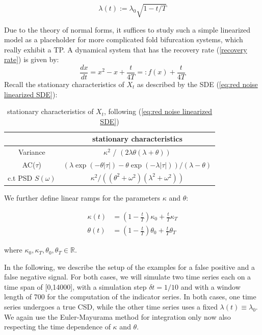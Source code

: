 \documentclass[%
thesis=student,%
coverpage=false,%
titlepage=false,%
headmarks=true, %
english,%
font=libertine, %
math=newpxtx, %
BCOR=5mm,%
coverBCOR=11mm%
]{tumbook}
\begin{document}
\begin{equation}
    \lambda(t) := \lambda_{0}\sqrt{1-t/T}
    \label{recovery rate}
\end{equation}
    
Due to the theory of normal forms, it suffices to study such a simple linearized model as a placeholder for more complicated fold bifurcation systems, which really exhibit a TP. A dynamical system that has the recovery rate (\ref{recovery rate}) is given by:
\[
\frac{dx}{dt} = x^2 - x + \frac{t}{4T} =: f(x) + \frac{t}{4T}
\]
Recall the stationary characteristics of $X_{t}$ as described by the SDE (\ref{eq:red noise linearized SDE}): 

\begin{table}[h!]
\centering
\begin{tabular}{|c|c|}
\hline
& stationary characteristics\\
\hline
Variance & $\kappa^2$ / $(2\lambda\theta(\lambda + \theta))$\\
AC($\tau$) & $(\lambda\exp(-\theta\lvert\tau\rvert)-\theta\exp(-\lambda\lvert\tau\rvert))/(\lambda - \theta)$\\
c.t PSD $S(\omega)$ & $\kappa^2/((\theta^2 + \omega^2)(\lambda^2 + \omega^2))$\\
\hline
\end{tabular}
\caption{stationary characteristics of $X_{t}$, following (\ref{eq:red noise linearized SDE})}
\label{tab:simple_table}
\end{table}

We further define linear ramps for the parameters $\kappa$ and $\theta$:

\begin{subequations}
    \begin{align*}
        \kappa(t) &= (1-\frac{t}{T})\kappa_{0} + \frac{t}{T}\kappa_{T} \\
        \theta(t) &= (1-\frac{t}{T})\theta_{0} + \frac{t}{T}\theta_{T}
    \end{align*}
\end{subequations}

where $\kappa_{0},\kappa_{T},\theta_{0},\theta_{T} \in \mathbb{R}$. 

In the following, we describe the setup of the examples for a false positive and a false negative signal. For both cases, we will simulate two time series each on a time span of [0,14000], with a simulation step $\delta t = 1/10$ and with a window length of 700 for the computation of the indicator series. In both cases, one time series undergoes a true CSD, while the other time series uses a fixed $\lambda(t) \equiv \lambda_{0}$. We again use the Euler-Mayurama method for integration only now also respecting the time dependence of $\kappa$ and $\theta$.
\end{document}
